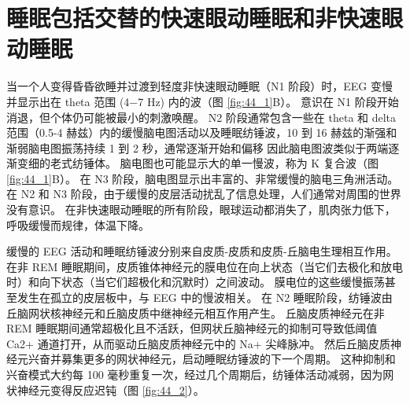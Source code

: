 \section{睡眠包括交替的快速眼动睡眠和非快速眼动睡眠}

当一个人变得昏昏欲睡并过渡到轻度非快速眼动睡眠（N1 阶段）时，EEG 变慢并显示出在 theta 范围 (4−7 Hz) 内的波（图 \ref{fig:44_1}B）。
意识在 N1 阶段开始消退，但个体仍可能被最小的刺激唤醒。
N2 阶段通常包含一些在 theta 和 delta 范围（0.5-4 赫兹）内的缓慢脑电图活动以及睡眠纺锤波，10 到 16 赫兹的渐强和渐弱脑电图振荡持续 1 到 2 秒，通常逐渐开始和偏移 因此脑电图波类似于两端逐渐变细的老式纺锤体。
脑电图也可能显示大的单一慢波，称为 K 复合波（图 \ref{fig:44_1}B）。
在 N3 阶段，脑电图显示出丰富的、非常缓慢的脑电三角洲活动。
在 N2 和 N3 阶段，由于缓慢的皮层活动扰乱了信息处理，人们通常对周围的世界没有意识。
在非快速眼动睡眠的所有阶段，眼球运动都消失了，肌肉张力低下，呼吸缓慢而规律，体温下降。


缓慢的 EEG 活动和睡眠纺锤波分别来自皮质-皮质和皮质-丘脑电生理相互作用。
在非 REM 睡眠期间，皮质锥体神经元的膜电位在向上状态（当它们去极化和放电时）和向下状态（当它们超极化和沉默时）之间波动。
膜电位的这些缓慢振荡甚至发生在孤立的皮层板中，与 EEG 中的慢波相关。
在 N2 睡眠阶段，纺锤波由丘脑网状核神经元和丘脑皮质中继神经元相互作用产生。
丘脑皮质神经元在非 REM 睡眠期间通常超极化且不活跃，但网状丘脑神经元的抑制可导致低阈值 Ca2+ 通道打开，从而驱动丘脑皮质神经元中的 Na+ 尖峰脉冲。
然后丘脑皮质神经元兴奋并募集更多的网状神经元，启动睡眠纺锤波的下一个周期。
这种抑制和兴奋模式大约每 100 毫秒重复一次，经过几个周期后，纺锤体活动减弱，因为网状神经元变得反应迟钝（图 \ref{fig:44_2}）。


